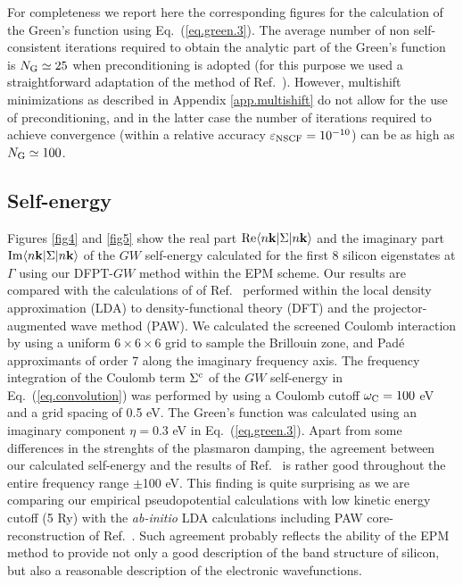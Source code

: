 \documentclass[twocolumn,prb,showpacs,superscriptaddress]{revtex4}
\def\wc{{\omega_{\rm C}}}
\def\k{{\bf k}}
\begin{document}
For completeness we report here the corresponding figures for
the calculation of the Green's function using Eq.\ (\ref{eq.green.3}). The average number
of non self-consistent iterations required to obtain the analytic part of the Green's
function is $N_{\rm G}\simeq 25$ when preconditioning is adopted (for this purpose 
we used a straightforward adaptation 
of the method of Ref.\ ). However, multishift minimizations as
described in Appendix \ref{app.multishift} do not allow for the use of preconditioning, and in the
latter case the number of iterations required to achieve convergence (within a relative
accuracy $\varepsilon_{\rm NSCF}=10^{-10}$) can be as high as $N_{\rm G}\simeq 100$. 

\subsection{Self-energy}\label{sec.5c}

Figures \ref{fig4} and \ref{fig5} show the real part ${\rm Re} \langle n\k| \Sigma|n\k\rangle$ 
and the imaginary part ${\rm Im} \langle n\k| \Sigma|n\k\rangle$ of the
$GW$ self-energy calculated for the first 8 silicon eigenstates at $\Gamma$
using our DFPT-$GW$ method within the EPM scheme. Our results are compared
with the calculations of of Ref.\  performed within the local density
approximation (LDA) to density-functional theory (DFT) and the projector-augmented wave method (PAW).
We calculated the screened Coulomb interaction by using a uniform $6\times 6 \times 6$ grid 
to sample the Brillouin zone, and Pad\'e approximants of order 7 along the imaginary
frequency axis. The frequency integration of the Coulomb term $\Sigma^{\rm c}$ of the $GW$ 
self-energy in Eq.~(\ref{eq.convolution}) was performed by using a Coulomb cutoff 
$\wc = 100$ eV and a grid spacing of 0.5 eV. The Green's function was calculated
using an imaginary component $\eta = 0.3$ eV in Eq.\ (\ref{eq.green.3}).
Apart from some differences in the strenghts of the plasmaron damping,
the agreement between our calculated self-energy and the results of Ref.~
is rather good throughout the entire frequency range $\pm$100 eV.
This finding is quite surprising as we are comparing our empirical pseudopotential
calculations with low kinetic energy cutoff (5 Ry) with the {\it ab-initio} LDA
calculations including PAW core-reconstruction of Ref.\ .
Such agreement probably reflects the ability of the EPM method to provide not only
a good description of the band structure of silicon, but also a reasonable
description of the electronic wavefunctions.
\end{document}
